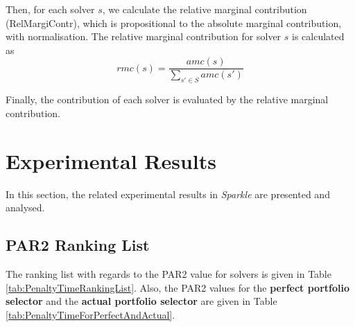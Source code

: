 \documentclass[british]{article}
\begin{document}
Then, for each solver $s$, we calculate the relative marginal contribution (Rel\textunderscore Margi\textunderscore Contr), which is propositional to the absolute marginal contribution, with normalisation. The relative marginal contribution for solver $s$ is calculated as 
\begin{equation}
\mathit{rmc(s)}=\frac{\mathit{amc(s)}}{\sum_{s' \in S}{amc(s')}}
\end{equation}

Finally, the contribution of each solver is evaluated by the relative marginal contribution.

\section{Experimental Results}
\label{sec:Experimental_Results}

In this section, the related experimental results in \emph{Sparkle} are presented and analysed.

\subsection{PAR2 Ranking List}
\label{sec:PAR2_Ranking}

The ranking list with regards to the PAR2 value for solvers is given in Table \ref{tab:PenaltyTimeRankingList}. Also, the PAR2 values for the \textbf{perfect portfolio selector} and the \textbf{actual portfolio selector} are given in Table \ref{tab:PenaltyTimeForPerfectAndActual}.
\end{document}
